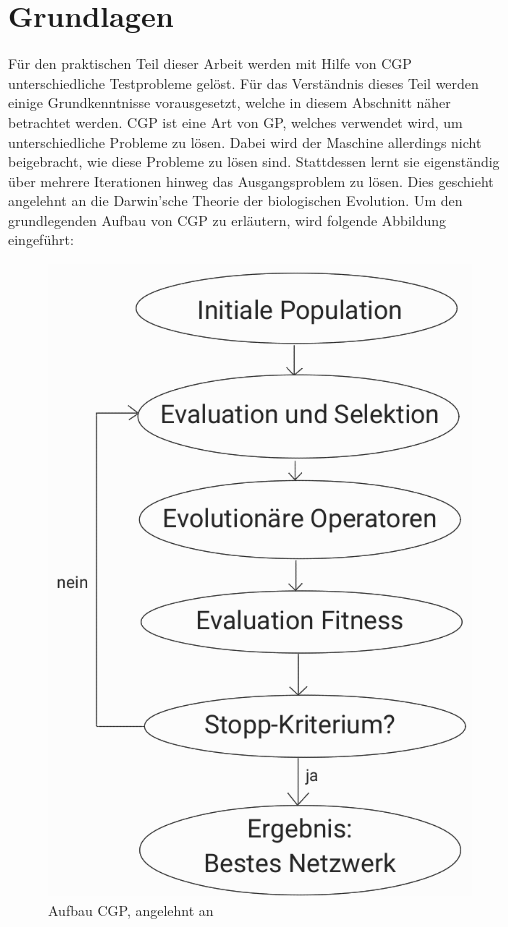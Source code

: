 \chapter{Grundlagen}
\label{Grundlagen}

Für den praktischen Teil dieser Arbeit werden mit Hilfe von CGP unterschiedliche Testprobleme gelöst. 
Für das Verständnis dieses Teil werden einige Grundkenntnisse vorausgesetzt, welche in diesem Abschnitt näher betrachtet werden.\newline
CGP ist eine Art von GP, welches verwendet wird, um unterschiedliche Probleme zu lösen.
Dabei wird der Maschine allerdings nicht beigebracht, wie diese Probleme zu lösen sind.
Stattdessen lernt sie eigenständig über mehrere Iterationen hinweg das Ausgangsproblem zu lösen.
Dies geschieht angelehnt an die Darwin’sche Theorie der biologischen Evolution. \cite{milad_taleby_ahvanooey_survey_2019} \newline
Um den grundlegenden Aufbau von CGP zu erläutern, wird folgende Abbildung eingeführt:

\begin{figure}[H]
    \centering
    \includegraphics[scale = 0.52]{Bilder/AufbauCGPVorgehenNachbildung.png}
    \caption{Aufbau CGP, angelehnt an \cite{torabi_using_2022}}
    \label{fig:aufbauCGP}
\end{figure}

